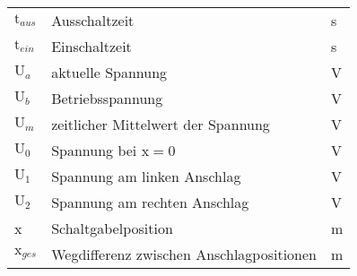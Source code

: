 \begin{table}[H]
\begin{tabular}{p{1.5cm}p{13.5cm}p{1.5cm}}
			$\text{t}_{aus}$ \dotfill& Ausschaltzeit & s\\
			$\text{t}_{ein}$ \dotfill& Einschaltzeit & s\\
			$\text{U}_a$ \dotfill& aktuelle Spannung & V\\
			$\text{U}_b$ \dotfill& Betriebsspannung & V\\
			$\text{U}_m$ \dotfill& zeitlicher Mittelwert der Spannung & V\\
			$\text{U}_0$ \dotfill& Spannung bei $\text{x}=0$& V\\
			$\text{U}_1$ \dotfill& Spannung am linken Anschlag & V\\
			$\text{U}_2$ \dotfill& Spannung am rechten Anschlag & V\\
			x \dotfill& Schaltgabelposition & m\\
			$\text{x}_{ges}$ \dotfill& Wegdifferenz zwischen Anschlagpositionen & m\\
			
			
			\end{tabular}	
\end{table}

